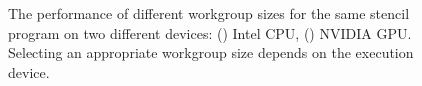\begin{figure}
{\begin{minipage}{.48\textwidth}
\begin{subfigure}[h]{.48\columnwidth}
      \vspace{-1.5em} %
      \caption{}
      \label{fig:motivation-2}
    \end{subfigure}
    \caption{%
      The performance of different workgroup sizes for the same stencil
      program on two different devices: ()
      Intel CPU, () NVIDIA GPU. Selecting an
      appropriate workgroup size depends on the execution device.%
    }
    \label{fig:motivation-arch}
  \end{minipage}%
}%
\hspace{2.5mm}
\end{figure}
